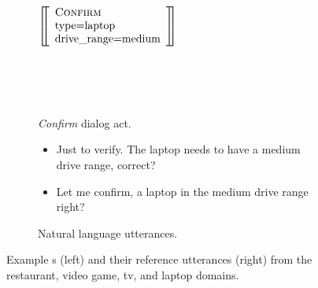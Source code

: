 \begin{figure}[p]
\begin{subfigure}{.35\textwidth}
~\\~\\

$\left[\!\!\left[\begin{array}{l} 
    \textsc{Confirm} \\ 
    \textrm{type=laptop} \\
    \textrm{drive\_range=medium} \\
\end{array}\right]\!\!\right]$ 

~\\~\\~\\

\caption{\emph{Confirm} dialog act.}\label{fig:confirmexample}
\end{subfigure}\hfill \begin{subfigure}{.58\textwidth}
\begin{itemize}
   \item Just to verify. The laptop needs to have a medium drive range, correct?
   \item Let me confirm, a laptop in the medium drive range right?
\end{itemize}
\caption{Natural language utterances.}
\label{fig:mr1utt}
\end{subfigure}



\caption{Example \meaningrepresentation s (left) and their reference utterances (right)
from the restaurant, video game, tv, and laptop domains.}
\label{fig:nlgexamples}
\end{figure}

